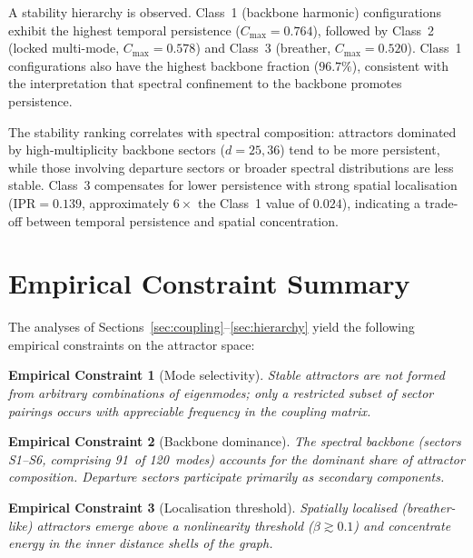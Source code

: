 \documentclass[12pt,a4paper]{article}
\newtheorem{constraint}{Empirical Constraint}
\begin{document}
A stability hierarchy is observed.  Class~1 (backbone harmonic)
configurations exhibit the highest temporal persistence
($C_{\max} = 0.764$), followed by Class~2 (locked multi-mode,
$C_{\max} = 0.578$) and Class~3 (breather, $C_{\max} = 0.520$).
Class~1 configurations also have the highest backbone fraction
($96.7\%$), consistent with the interpretation that spectral
confinement to the backbone promotes persistence.

The stability ranking correlates with spectral composition: attractors
dominated by high-multiplicity backbone sectors ($d = 25, 36$) tend
to be more persistent, while those involving departure sectors or
broader spectral distributions are less stable.  Class~3 compensates
for lower persistence with strong spatial localisation
($\mathrm{IPR} = 0.139$, approximately $6\times$ the Class~1 value
of $0.024$), indicating a trade-off between temporal persistence and
spatial concentration.


\section{Empirical Constraint Summary}\label{sec:constraints}

The analyses of Sections~\ref{sec:coupling}--\ref{sec:hierarchy}
yield the following empirical constraints on the attractor space:

\begin{constraint}[Mode selectivity]
Stable attractors are not formed from arbitrary combinations of
eigenmodes; only a restricted subset of sector pairings occurs with
appreciable frequency in the coupling matrix.
\end{constraint}

\begin{constraint}[Backbone dominance]
The spectral backbone (sectors S1--S6, comprising 91~of 120~modes)
accounts for the dominant share of attractor composition.  Departure
sectors participate primarily as secondary components.
\end{constraint}

\begin{constraint}[Localisation threshold]
Spatially localised (breather-like) attractors emerge above a
nonlinearity threshold ($\beta \gtrsim 0.1$) and concentrate energy
in the inner distance shells of the graph.
\end{constraint}
\end{document}
